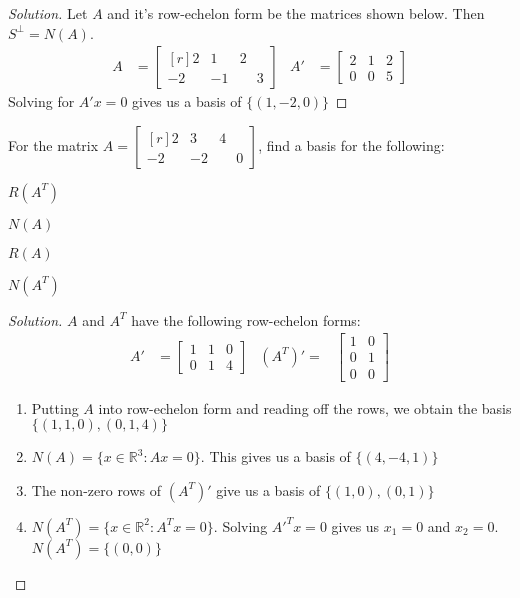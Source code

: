 \documentclass[crop=false,class=book,oneside]{standalone}
\begin{document}
        \begin{proof}[Solution]
        Let $A$ and it's row-echelon form be the matrices shown below. Then $S^{\perp} = N(A)$.
        \begin{align*}
            A&=\begin{bmatrix*}[r] 2 & 1 & 2 \\ -2 & -1 & \phantom{-}3\end{bmatrix*} & A'&=\begin{bmatrix} 2 & 1 & 2 \\ 0 & 0 & 5 \end{bmatrix}
        \end{align*}
        Solving for $A'x = 0$ gives us a basis of $\{(1,-2,0)\}$
        \end{proof}
        \begin{problem}
        For the matrix $A = \begin{bmatrix*}[r] 2 & 3 & 4 \\ -2 & -2 & \phantom{-}0 \end{bmatrix*}$, find a basis for the following:
        \begin{enumerate}
        \begin{multicols}{4}
            \item $R(A^T)$
            \item $N(A)$
            \item $R(A)$
            \item $N(A^T)$
        \end{multicols}
        \end{enumerate}
        \end{problem}
        \begin{proof}[Solution]
        $A$ and $A^{T}$ have the following row-echelon forms:
        \begin{align*}
            A'&=\begin{bmatrix}1&1&0\\0&1&4\end{bmatrix} & (A^{T})'=&\begin{bmatrix}1&0\\0&1\\0&0\end{bmatrix}
        \end{align*}
        \begin{enumerate}
            \item Putting $A$ into row-echelon  form and reading off the rows, we obtain the basis $\{(1,1,0),(0,1,4)\}$
            \item $N(A) = \{x\in \mathbb{R}^3:  Ax = 0\}$. This gives us a basis of $\{(4,-4,1)\}$
            \item The non-zero rows of $(A^{T})'$ give us a basis of $\{(1,0),(0,1)\}$
            \item $N(A^T) = \{x\in \mathbb{R}^2: A^Tx = 0\}$. Solving $A'^{T}x=0$ gives us $x_1 = 0$ and $x_2 = 0$. $N(A^T) = \{(0,0)\}$
        \end{enumerate}
        \end{proof}
\end{document}
